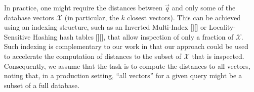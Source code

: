 In practice, one might require the distances between $\vec{q}$ and only some of the database vectors $\mathcal{X}$ (in particular, the $k$ closest vectors). This can be achieved using an indexing structure, such as an Inverted Multi-Index [][] or Locality-Sensitive Hashing hash tables [][], that allow inspection of only a fraction of $\mathcal{X}$. Such indexing is complementary to our work in that our approach could be used to accelerate the computation of distances to the subset of $\mathcal{X}$ that is inspected. Consequently, we assume that the task is to compute the distances to all vectors, noting that, in a production setting, ``all vectors'' for a given query might be a subset of a full database.



